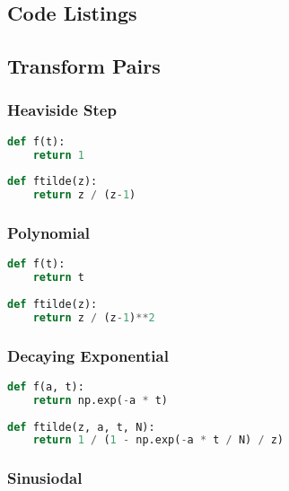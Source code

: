 \begin{appendices}

%

\chapter{Code Listings}\label{chapter:code_listings}

\section{Transform Pairs}

\subsection{Heaviside Step}
\begin{lstlisting}[language=Python, caption= null]
def f(t):
    return 1
    
def ftilde(z):
    return z / (z-1)
\end{lstlisting}

\subsection{Polynomial}
\begin{lstlisting}[language=Python, caption= null]
def f(t):
    return t
    
def ftilde(z):
    return z / (z-1)**2
\end{lstlisting}

\subsection{Decaying Exponential}
\begin{lstlisting}[language=Python, caption= null]
def f(a, t):
    return np.exp(-a * t)
    
def ftilde(z, a, t, N):
    return 1 / (1 - np.exp(-a * t / N) / z)
\end{lstlisting}

\subsection{Sinusiodal}


\end{appendices}
